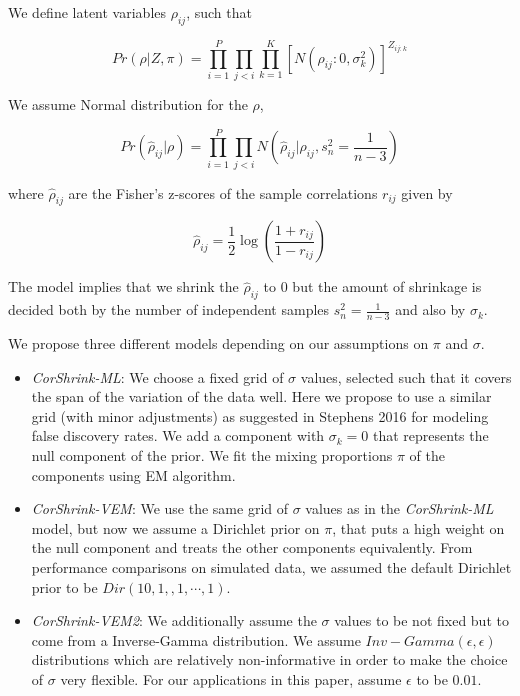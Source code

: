 We define  latent variables $\rho_{ij}$, such that

\begin{equation}
Pr \left ( \rho |  Z, \pi  \right )  = \prod_{i=1}^{P} \prod_{j < i} \prod_{k=1}^{K} \left [ N \left (\rho_{ij} : 0, \sigma^2_{k} \right ) \right ]^{Z_{ij:k}}  
\end{equation}

We assume Normal distribution for the $\rho$,

\begin{equation}
Pr \left (\hat{\rho}_{ij} | \rho \right ) = \prod_{i=1}^{P} \prod_{j < i } N \left (\hat{\rho}_{ij} | \rho_{ij}, s^2_n = \frac{1}{n-3} \right)  
\end{equation}

where $\hat{\rho}_{ij}$ are the Fisher's z-scores of the sample correlations $r_{ij}$ given by 

\begin{equation}
\hat{\rho}_{ij} = \frac{1}{2} \log \left ( \frac{1+r_{ij}}{1- r_{ij}} \right ) 
\end{equation}

The model implies that we shrink the $ \hat{\rho}_{ij}$ to $0$ but the amount of shrinkage is decided both by the number of independent samples $s^2_{n} = \frac{1}{n-3}$ and also by $\sigma_{k}$. 

We propose three different models depending on our assumptions on $\pi$ and $\sigma$. 

\begin{itemize}

\item \textit{CorShrink-ML}:  We choose a fixed grid of $\sigma$ values, selected such that it covers the span of the variation of the data well. Here we propose to use a similar grid (with minor adjustments) as suggested in Stephens 2016 \cite{Stephens2016} for modeling false discovery rates. We add a component with $\sigma_k=0$ that represents the null component of the prior. We fit the mixing proportions $\pi$ of the components using EM algorithm. 

\item \textit{CorShrink-VEM}: We use the same grid of $\sigma$ values as in the \textit{CorShrink-ML} model, but now we assume a Dirichlet prior on $\pi$, that puts a high weight on the null component and treats the other components equivalently. From performance comparisons on simulated data, we assumed the default Dirichlet prior to be $Dir(10, 1, ,1, \cdots, 1)$. 

\item \textit{CorShrink-VEM2}: We additionally assume the $\sigma$ values to be not fixed but to come from a Inverse-Gamma distribution. We assume $Inv-Gamma(\epsilon, \epsilon)$ distributions which are relatively non-informative in order to make the choice of $\sigma$ very flexible. For our applications in this paper, assume $\epsilon$ to be $0.01$.

\end{itemize}


